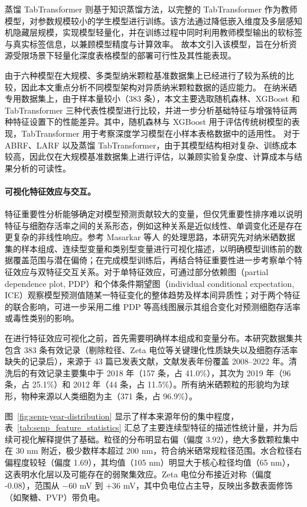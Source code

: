 蒸馏 TabTransformer 则基于知识蒸馏方法，以完整的 TabTransformer 作为教师模型，对参数规模较小的学生模型进行训练。该方法通过降低嵌入维度及多层感知机隐藏层规模，实现模型轻量化，并在训练过程中同时利用教师模型输出的软标签与真实标签信息，以兼顾模型精度与计算效率。
故本文引入该模型，旨在分析资源受限场景下轻量化深度表格模型的部署可行性及其性能表现。

由于六种模型在大规模、多类型纳米颗粒基准数据集上已经进行了较为系统的比较，因此本文重点分析不同模型架构对异质纳米颗粒数据的适应能力。
在纳米硒专用数据集上，由于样本量较小（383 条），本文主要选取随机森林、XGBoost 和 TabTransformer 三种代表性模型进行比较，并进一步分析基础特征与增强特征两种特征设置下的性能差异。其中，随机森林与 XGBoost 用于评估传统树模型的表现，TabTransformer 用于考察深度学习模型在小样本表格数据中的适用性。
对于 ABRF、LARF 以及蒸馏 TabTransformer，由于其模型结构相对复杂、训练成本较高，因此仅在大规模基准数据集上进行评估，以兼顾实验复杂度、计算成本与结果分析的可读性。

\paragraph{可视化特征效应与交互。}
特征重要性分析能够确定对模型预测贡献较大的变量，但仅凭重要性排序难以说明特征与细胞存活率之间的关系形态，例如这种关系是近似线性、单调变化还是存在更复杂的非线性响应。参考 Masarkar 等人 \cite{masarkar2024} 的处理思路，本研究先对纳米硒数据集的样本组成、连续型变量和类别型变量进行可视化描述，以明确模型训练前的数据覆盖范围与潜在偏倚；在完成模型训练后，再结合特征重要性进一步考察单个特征效应与双特征交互关系。对于单特征效应，可通过部分依赖图（partial dependence plot, PDP）和个体条件期望图（individual conditional expectation, ICE）观察模型预测值随某一特征变化的整体趋势及样本间异质性；对于两个特征的联合影响，可进一步采用二维 PDP 等高线图展示其组合变化对预测细胞存活率或毒性类别的影响。

在进行特征效应可视化之前，首先需要明确样本组成和变量分布。本研究数据集共包含 383 条有效记录（剔除粒径、Zeta 电位等关键理化性质缺失以及细胞存活率缺失的记录后），来源于 43 篇已发表文献，文献发表年份覆盖 2008--2022 年。清洗后的有效记录主要集中于 2018 年（157 条，占 41.0\%），其次为 2019 年（96 条，占 25.1\%）和 2012 年（44 条，占 11.5\%）。所有纳米硒颗粒的形貌均为球形，物种来源以人类细胞为主（371 条，占 96.9\%）。

图~\ref{fig:senp-year-distribution} 显示了样本来源年份的集中程度，表~\ref{tab:senp_feature_statistics} 汇总了主要连续型特征的描述性统计量，并为后续可视化解释提供了基础。粒径的分布明显右偏（偏度 3.92），绝大多数颗粒集中在 30 nm 附近，极少数样本超过 200 nm，符合纳米硒常规粒径范围。水合粒径右偏程度较轻（偏度 1.69），其均值（105 nm）明显大于核心粒径均值（65 nm），这表明水化层以及可能存在的弱聚集效应。Zeta 电位分布接近对称（偏度 -0.08），范围从 $-60$ mV 到 $+36$ mV，其中负电位占主导，反映出多数表面修饰（如聚糖、PVP）带负电。

